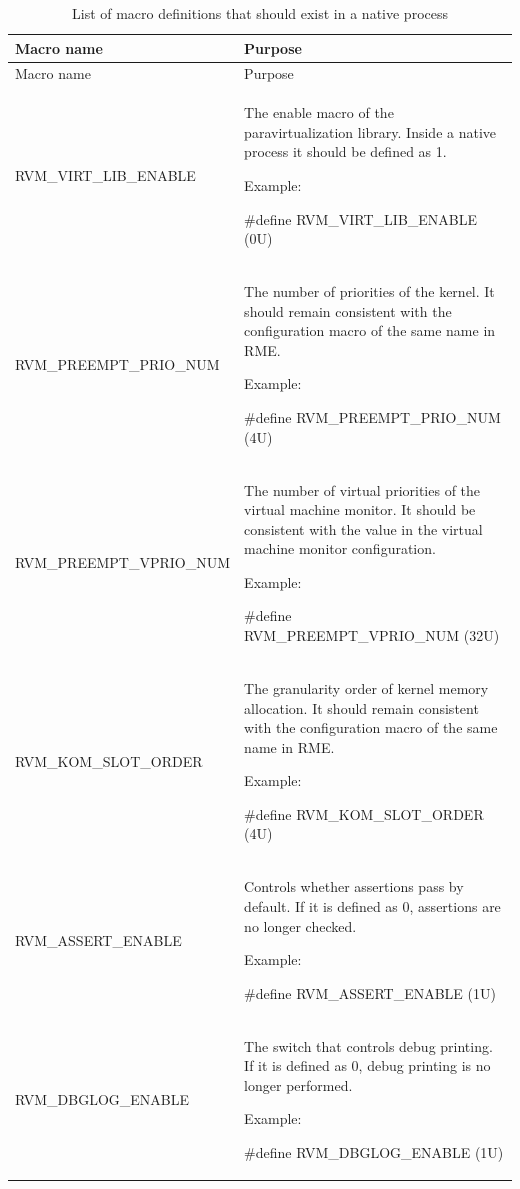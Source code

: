 \begin{xltabular}{\textwidth}{@{}>{\hsize\raggedright\arraybackslash}X>{\hsize\raggedright\arraybackslash}X@{}}
\caption{List of macro definitions that should exist in a native process}\label{tab:3-4}\\
\toprule
Macro name & Purpose\tabularnewline
\endfirsthead
\toprule
Macro name & Purpose\tabularnewline
\midrule
\endhead
\bottomrule
\endlastfoot
RVM\_\allowbreak{}VIRT\_\allowbreak{}LIB\_\allowbreak{}ENABLE\strut
 & The enable macro of the paravirtualization library. Inside a native process it should be defined as 1.

Example:

\#define RVM\_\allowbreak{}VIRT\_\allowbreak{}LIB\_\allowbreak{}ENABLE (0U)\strut
\tabularnewline
RVM\_\allowbreak{}PREEMPT\_\allowbreak{}PRIO\_\allowbreak{}NUM\strut
 & The number of priorities of the kernel. It should remain consistent with the configuration macro of the same name in RME.

Example:

\#define RVM\_\allowbreak{}PREEMPT\_\allowbreak{}PRIO\_\allowbreak{}NUM (4U)\strut
\tabularnewline
RVM\_\allowbreak{}PREEMPT\_\allowbreak{}VPRIO\_\allowbreak{}NUM\strut
 & The number of virtual priorities of the virtual machine monitor. It should be consistent with the value in the virtual machine monitor configuration.

Example:

\#define RVM\_\allowbreak{}PREEMPT\_\allowbreak{}VPRIO\_\allowbreak{}NUM (32U)\strut
\tabularnewline
RVM\_\allowbreak{}KOM\_\allowbreak{}SLOT\_\allowbreak{}ORDER\strut
 & The granularity order of kernel memory allocation. It should remain consistent with the configuration macro of the same name in RME.

Example:

\#define RVM\_\allowbreak{}KOM\_\allowbreak{}SLOT\_\allowbreak{}ORDER (4U)\strut
\tabularnewline
RVM\_\allowbreak{}ASSERT\_\allowbreak{}ENABLE\strut
 & Controls whether assertions pass by default. If it is defined as 0, assertions are no longer checked.

Example:

\#define RVM\_\allowbreak{}ASSERT\_\allowbreak{}ENABLE (1U)\strut
\tabularnewline
RVM\_\allowbreak{}DBGLOG\_\allowbreak{}ENABLE\strut
 & The switch that controls debug printing. If it is defined as 0, debug printing is no longer performed.

Example:

\#define RVM\_\allowbreak{}DBGLOG\_\allowbreak{}ENABLE (1U)\strut
\tabularnewline
\end{xltabular}

